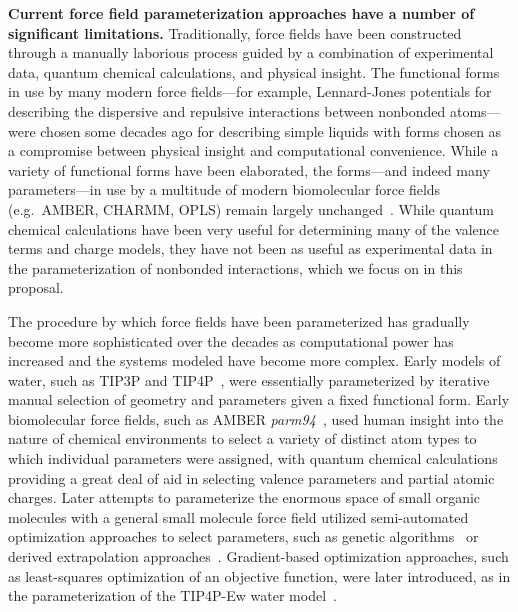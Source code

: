 \documentclass[aps,pre,twocolumn,nofootinbib,superscriptaddress,linenumbers]{revtex4-1}
\begin{document}
{\bf Current force field parameterization approaches have a number of significant limitations.}
Traditionally, force fields have been constructed through a manually laborious process guided by a combination of experimental data, quantum chemical calculations, and physical insight.
The functional forms in use by many modern force fields---for example, Lennard-Jones potentials for describing the dispersive and repulsive interactions between nonbonded atoms---were chosen some decades ago for describing simple liquids with forms chosen as a compromise between physical insight and computational convenience.
While a variety of functional forms have been elaborated, the forms---and indeed many parameters---in use by a multitude of modern biomolecular force fields (e.g.~AMBER, CHARMM, OPLS) remain largely unchanged~\citep{ponder-case:adv-prot-chem:2003:force-fields-review}.
While quantum chemical calculations have been very useful for determining many of the valence terms and charge models, they have not been as useful as experimental data in the parameterization of nonbonded interactions, which we focus on in this proposal.

The procedure by which force fields have been parameterized has gradually become more sophisticated over the decades as computational power has increased and the systems modeled have become more complex.
Early models of water, such as TIP3P and TIP4P~\cite{jorgensen_comparison_1983}, were essentially parameterized by iterative manual selection of geometry and parameters given a fixed functional form.
Early biomolecular force fields, such as AMBER {\em parm94}~\cite{cornell-kollman:jacs:1995:amber94}, used human insight into the nature of chemical environments to select a variety of distinct atom types to which individual parameters were assigned, with quantum chemical calculations providing a great deal of aid in selecting valence parameters and partial atomic charges.
Later attempts to parameterize the enormous space of small organic molecules with a general small molecule force field utilized semi-automated optimization approaches to select parameters, such as genetic algorithms~\cite{wang-kollman:j-comput-chem:2001:genetic-algorithm-parameterization} or derived extrapolation approaches~\cite{Burger2013,Law1997,MacKerrell2002,longo2005,Netz2009}.
Gradient-based optimization approaches, such as least-squares optimization of an objective function, were later introduced, as in the parameterization of the TIP4P-Ew water model~\cite{tip4p-ew}.
\end{document}
